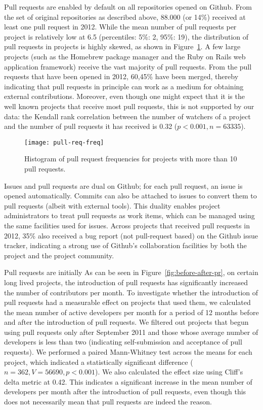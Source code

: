 \documentclass{sig-alternate}
\begin{document}
Pull requests are enabled by default on all repositories opened on Github.  From
the set of original repositories as described above, 88.000 (or 14\%) received
at least one pull request in 2012.  While the mean number of pull requests per
project is relatively low at 6.5 (percentiles: 5\%: 2, 95\%: 19), the
distribution of pull requests in projects is highly skewed, as shown in
Figure~\ref{fig:prfreq}.  A few large projects (such as the Homebrew package
manager and the Ruby on Rails web application framework) receive the vast
majority of pull requests. From the pull requests that have been opened in
2012, 60,45\% have been merged, thereby indicating that pull requests in
principle can work as a medium for obtaining external contributions.  Moreover,
even though one might expect that it is the well known projects that receive
most pull requests, this is not supported by our data: the Kendall rank
correlation between the number of watchers of a project and the number of pull
requests it has received is 0.32 ($p < 0.001, n = 63335$).

\begin{figure}
  \begin{center}
    \texttt{[image: pull-req-freq]}
  \end{center}
  \caption{Histogram of pull request frequencies for projects with more than
  10 pull requests.}
  \label{fig:prfreq}
\end{figure}

Issues and pull requests are dual on Github; for each pull request, an issue is
opened automatically. Commits can also be attached to issues to convert them to
pull requests (albeit with external tools). This duality enables project
administrators to treat pull requests as work items, which can be managed using
the same facilities used for issues. Across projects that received pull
requests in 2012, 35\% also received a bug report (not pull-request based) 
on the Github issue tracker, indicating a strong use of Github's collaboration
facilities by both the project and the project community.

Pull requests are initially 
As can be seen in Figure~\ref{fig:before-after-pr}, on certain
long lived projects, the introduction of pull requests has significantly
increased the number of contributors per month. To investigate whether the
introduction of pull requests had a measurable effect on projects that used
them, we calculated the mean number of active developers per month for a period
of 12 months before and after the introduction of pull requests. We filtered out
projects that begun using pull requests only after September 2011 and those
whose average number of developers is less than two (indicating self-submission
and acceptance of pull requests). We performed a paired Mann-Whitney test
across the means for each project, which indicated a statistically significant
difference ($n = 362, V = 56690, p < 0.001$). We also calculated the effect size
using Cliff's delta metric at 0.42. This indicates a significant increase in the
mean number of developers per month after the introduction of pull requests,
even though this does not necessarily mean that pull requests are indeed the
reason.
\end{document}
